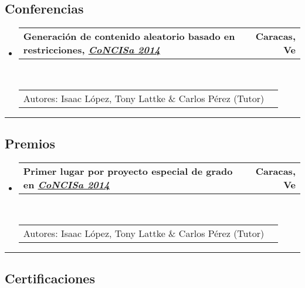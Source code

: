 \documentclass[10pt,letterpaper]{article}
\makeatletter
\newcommand{\headerrow}[2]
{\begin{tabular*}{\linewidth}{l@{\extracolsep{\fill}}r}
	#1 &
	#2 \\
\end{tabular*}}
\makeatother
\begin{document}
\subsection*{Conferencias}

\begin{itemize}
  \parskip=0.1em
\item 
   \headerrow
   {\textbf{Generación de contenido aleatorio basado en restricciones, \emph{\href{http://www.concisa.net.ve/2014/}{CoNCISa 2014}}}}
   {\textbf{Caracas, Ve}}
  \\
  \headerrow
   {Autores: Isaac López, Tony Lattke \& Carlos Pérez (Tutor)}{}
\end{itemize}

\hrule
\vspace{-0.4em}
\subsection*{Premios}

\begin{itemize}
  \parskip=0.1em
\item 
   \headerrow
   {\textbf{Primer lugar por proyecto especial de grado en \emph{\href{http://www.concisa.net.ve/2014/}{CoNCISa 2014}}}}
   {\textbf{Caracas, Ve}}
  \\
  \headerrow
   {Autores: Isaac López, Tony Lattke \& Carlos Pérez (Tutor)}{}
\end{itemize}

\newpage
\hrule
\vspace{-0.4em}
\subsection*{Certificaciones}
\end{document}

